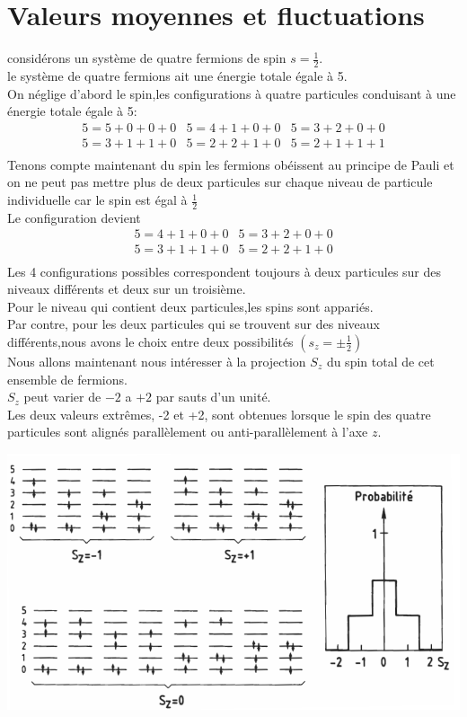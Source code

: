 \documentclass[12pt,oneside]{book}
\begin{document}
\section{Valeurs moyennes et fluctuations}
considérons un système de quatre fermions de spin $s = \frac{1}{2}$.\\
le système de quatre fermions ait une énergie totale égale à 5.\\
On néglige d'abord le spin,les configurations à quatre particules conduisant à une énergie totale égale à 5:
\[   \begin{matrix}
		5=5+0+0+0 & 5=4+1+0+0 & 5 = 3+2+0+0 \\
		5=3+1+1+0 & 5=2+2+1+0 & 5 = 2+1+1+1 \\
	\end{matrix} \]
Tenons compte maintenant du spin les fermions obéissent au principe de Pauli et on ne peut pas mettre plus de deux particules sur chaque niveau de particule individuelle car le spin est égal à $\frac{1}{2}$\\
Le configuration devient
\[   \begin{matrix}
		5=4+1+0+0 & 5 = 3+2+0+0 \\
		5=3+1+1+0 & 5=2+2+1+0   \\
	\end{matrix} \]
Les 4 configurations possibles correspondent toujours à deux particules sur des niveaux différents et deux sur un troisième.\\
Pour le niveau qui contient deux particules,les spins sont appariés.\\
Par contre, pour les deux particules qui se trouvent sur des niveaux différents,nous avons le choix entre deux possibilités $(s_z = \pm\frac{1}{2})$\\
Nous allons maintenant nous intéresser à la projection $S_z$ du spin total de cet ensemble de fermions.\\
$S_z$ peut varier de $-2$ a $+2$ par sauts d'un unité.\\
Les deux valeurs extrêmes, -2 et +2, sont obtenues lorsque le spin des quatre particules sont alignés parallèlement ou anti-parallèlement à l'axe $z$.
\begin{center}
	\includegraphics[width=0.5\linewidth]{../pic/3306/16.png}
\end{center}
\end{document}
